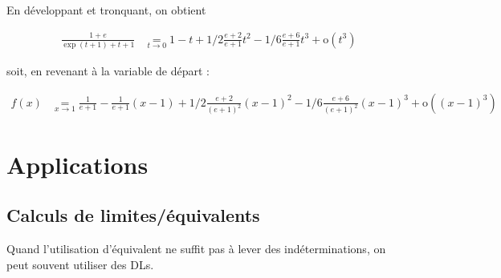 \documentclass[12pt]{article}
\begin{document}
\begin{itemize}
En développant et tronquant, on obtient

\begin{align*}
\frac{1+e}{\exp(t+1)+t+1} &\underset{t\rightarrow 0}{=} 1 -
 t + 1/2 \frac{e+2}{e+1} t^2 - 1/6 \frac{e+6}{e+1} t^3 + \text{o}(t^3)
\end{align*}

soit, en revenant à la variable de départ :

\begin{align*}
f(x) &\underset{x\rightarrow 1}{=} \frac{1}{e+1} - \frac{1}{e+1}
 (x-1) + 1/2 \frac{e+2}{(e+1)^2} (x-1)^2 - 1/6 \frac{e+6}{(e+1)^2} (x-1)^3 + \text{o}((x-1)^3)
\end{align*}



\end{itemize}



\section{Applications}



\subsection{Calculs de limites/équivalents}

Quand l'utilisation d'équivalent ne suffit pas à lever des
indéterminations, on peut souvent utiliser des DLs. 
\end{document}
